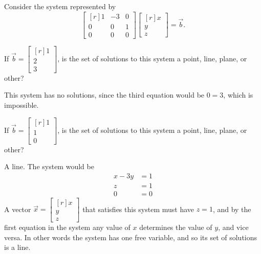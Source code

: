 \documentclass{problemset}
\newcommand{\mat}[1]{\begin{bmatrix*}[r]#1\end{bmatrix*}}
\begin{document}
	\question
	Consider the system represented by
	\[
		\mat{1&-3&0\\0&0&1\\0&0&0}\mat{x\\y\\z}=\vec b.
	\]
	\begin{parts}
		\item If $\vec b=\mat{1\\2\\3}$, is the set of solutions to this system
			a point, line, plane, or other?
			\begin{solution}
				This system has no solutions, since the third equation would be
				$0=3$, which is impossible. 
			\end{solution}
		\item If $\vec b=\mat{1\\1\\0}$, is the set of solutions to this system
			a point, line, plane, or other?
			\begin{solution}
				A line. The system would be
				\begin{align*}
					x - 3y &= 1 \\
					z &= 1 \\
					0 &= 0
				\end{align*}
				A vector $\vec x=\mat{x\\y\\z}$ that satisfies this system must have
				$z=1$, and by the first equation in the system any value of $x$
				determines the value of $y$, and vice versa. In other words the
				system has one free variable, and so its set of solutions is a line.
			\end{solution}
	\end{parts}
\end{document}
